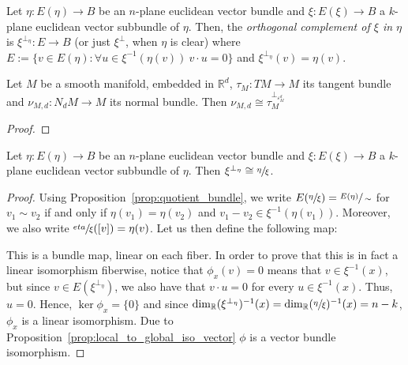 \begin{definition} Let $\eta:E(\eta)\to B$ be an $n$-plane euclidean vector bundle and $\xi:E(\xi)\to B$ a $k$-plane euclidean vector subbundle of $\eta$. Then, the \emph{orthogonal complement of $\xi$ in $\eta$} is $\xi^{\perp_{\eta}}:E\to B$ (or just $\xi^{\perp}$, when $\eta$ is clear) where $E:=\{v\in E(\eta):\forall u\in\xi^{-1}(\eta(v))\ v\cdot u=0\}$ and $\xi^{\perp_{\eta}}(v)=\eta(v)$.
\end{definition}

\begin{proposition}\label{prop:tangent_normal_vb} Let $M$ be a smooth manifold, embedded in $\mathbb{R}^d$, $\tau_M:TM\to M$ its tangent bundle and $\nu_{M,d}:N_dM\to M$ its normal bundle. Then $\nu_{M,d}\cong\tau_M^{\perp_{\varepsilon_M^d}}$
\end{proposition}
\begin{proof}
\end{proof}

\begin{lemma} Let $\eta:E(\eta)\to B$ be an $n$-plane euclidean vector bundle and $\xi:E(\xi)\to B$ a $k$-plane euclidean vector subbundle of $\eta$. Then $\xi^{\perp_{\eta}}\cong\sfrac{\eta}{\xi}$.
\end{lemma}
\begin{proof} Using Proposition~\ref{prop:quotient_bundle}, we write $E(\sfrac{\eta}{\xi})=\sfrac{E(\eta)}{\sim}$ for $v_1\sim v_2$ if and only if $\eta(v_1)=\eta(v_2)$ and $v_1-v_2\in\xi^{-1}(\eta(v_1))$. Moreover, we also write $\sfrac{eta}{\xi}([v])=\eta(v)$. Let us then define the following map:
\begin{center}
\end{center}
This is a bundle map, linear on each fiber. In order to prove that this is in fact a linear isomorphism fiberwise, notice that $\phi_x(v)=0$ means that $v\in\xi^{-1}(x)$, but since $v\in E(\xi^{\perp_{\eta}})$, we also have that $v\cdot u=0$ for every $u\in\xi^{-1}(x)$. Thus, $u=0$. Hence, $\ker\phi_x=\{0\}$ and since $\dim_{\mathbb{R}}(\xi^{\perp_{\eta}})^{-1}(x)=\dim_{\mathbb{R}}(\sfrac{\eta}{\xi})^{-1}(x)=n-k$, $\phi_x$ is a linear isomorphism. Due to Proposition~\ref{prop:local_to_global_iso_vector} $\phi$ is a vector bundle isomorphism.
\end{proof}

